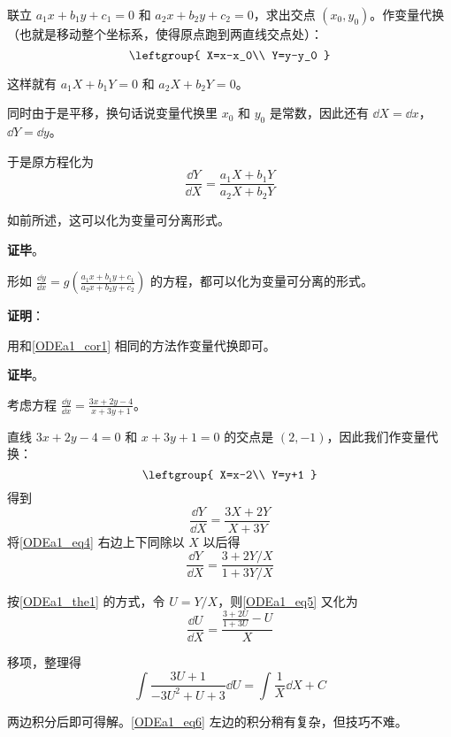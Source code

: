 联立 $a_1x+b_1y+c_1=0$ 和 $a_2x+b_2y+c_2=0$，求出交点 $(x_0, y_0)$。作变量代换（也就是移动整个坐标系，使得原点跑到两直线交点处）：
\begin{equation}
\leftgroup{
    X=x-x_0\\
    Y=y-y_0
}
\end{equation}

这样就有 $a_1X+b_1Y=0$ 和 $a_2X+b_2Y=0$。

同时由于是平移，换句话说变量代换里 $x_0$ 和 $y_0$ 是常数，因此还有 $\dd X=\dd x$，$\dd Y=\dd y$。

于是原方程化为
\begin{equation}
\frac{\dd Y}{\dd X}=\frac{a_1X+b_1Y}{a_2X+b_2Y}
\end{equation}

如前所述，这可以化为变量可分离形式。

\textbf{证毕}。

\begin{corollary}{}
形如 $\frac{\dd y}{\dd x}=g(\frac{a_1x+b_1y+c_1}{a_2x+b_2y+c_2})$ 的方程，都可以化为变量可分离的形式。
\end{corollary}

\textbf{证明}：

用和\autoref{ODEa1_cor1} 相同的方法作变量代换即可。

\textbf{证毕}。





\begin{example}{}
考虑方程 $\frac{\dd y}{\dd x}=\frac{3x+2y-4}{x+3y+1}$。

直线 $3x+2y-4=0$ 和 $x+3y+1=0$ 的交点是 $(2, -1)$，因此我们作变量代换：
\begin{equation}
\leftgroup{
    X=x-2\\
    Y=y+1
}
\end{equation}
得到
\begin{equation}\label{ODEa1_eq4}
\frac{\dd Y}{\dd X}=\frac{3X+2Y}{X+3Y}
\end{equation}
将\autoref{ODEa1_eq4} 右边上下同除以 $X$ 以后得
\begin{equation}\label{ODEa1_eq5}
\frac{\dd Y}{\dd X}=\frac{3+2Y/X}{1+3Y/X}
\end{equation}

按\autoref{ODEa1_the1} 的方式，令 $U=Y/X$，则\autoref{ODEa1_eq5} 又化为
\begin{equation}
\frac{\dd U}{\dd X}=\frac{\frac{3+2U}{1+3U}-U}{X}
\end{equation}

移项，整理得
\begin{equation}\label{ODEa1_eq6}
\int\frac{3U+1}{-3U^2+U+3}\dd U=\int\frac{1}{X}\dd X+C
\end{equation}

两边积分后即可得解。\autoref{ODEa1_eq6} 左边的积分稍有复杂，但技巧不难。

\end{example}








